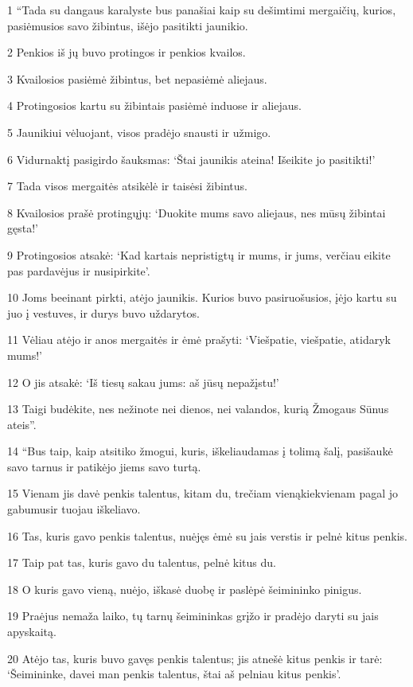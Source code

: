 \par 1 “Tada su dangaus karalyste bus panašiai kaip su dešimtimi mergaičių, kurios, pasiėmusios savo žibintus, išėjo pasitikti jaunikio. 
\par 2 Penkios iš jų buvo protingos ir penkios kvailos. 
\par 3 Kvailosios pasiėmė žibintus, bet nepasiėmė aliejaus. 
\par 4 Protingosios kartu su žibintais pasiėmė induose ir aliejaus. 
\par 5 Jaunikiui vėluojant, visos pradėjo snausti ir užmigo. 
\par 6 Vidurnaktį pasigirdo šauksmas: ‘Štai jaunikis ateina! Išeikite jo pasitikti!’ 
\par 7 Tada visos mergaitės atsikėlė ir taisėsi žibintus. 
\par 8 Kvailosios prašė protingųjų: ‘Duokite mums savo aliejaus, nes mūsų žibintai gęsta!’ 
\par 9 Protingosios atsakė: ‘Kad kartais nepristigtų ir mums, ir jums, verčiau eikite pas pardavėjus ir nusipirkite’. 
\par 10 Joms beeinant pirkti, atėjo jaunikis. Kurios buvo pasiruošusios, įėjo kartu su juo į vestuves, ir durys buvo uždarytos. 
\par 11 Vėliau atėjo ir anos mergaitės ir ėmė prašyti: ‘Viešpatie, viešpatie, atidaryk mums!’ 
\par 12 O jis atsakė: ‘Iš tiesų sakau jums: aš jūsų nepažįstu!’ 
\par 13 Taigi budėkite, nes nežinote nei dienos, nei valandos, kurią Žmogaus Sūnus ateis”. 
\par 14 “Bus taip, kaip atsitiko žmogui, kuris, iškeliaudamas į tolimą šalį, pasišaukė savo tarnus ir patikėjo jiems savo turtą. 
\par 15 Vienam jis davė penkis talentus, kitam du, trečiam vieną­kiekvienam pagal jo gabumus­ir tuojau iškeliavo. 
\par 16 Tas, kuris gavo penkis talentus, nuėjęs ėmė su jais verstis ir pelnė kitus penkis. 
\par 17 Taip pat tas, kuris gavo du talentus, pelnė kitus du. 
\par 18 O kuris gavo vieną, nuėjo, iškasė duobę ir paslėpė šeimininko pinigus. 
\par 19 Praėjus nemaža laiko, tų tarnų šeimininkas grįžo ir pradėjo daryti su jais apyskaitą. 
\par 20 Atėjo tas, kuris buvo gavęs penkis talentus; jis atnešė kitus penkis ir tarė: ‘Šeimininke, davei man penkis talentus, štai aš pelniau kitus penkis’. 
